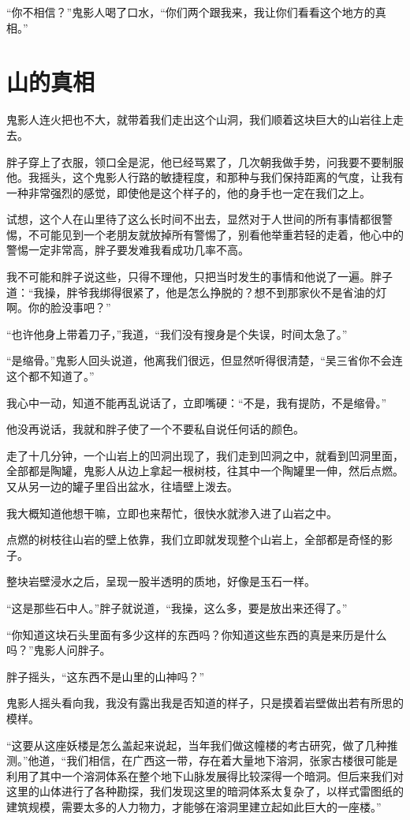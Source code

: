 “你不相信？”鬼影人喝了口水，“你们两个跟我来，我让你们看看这个地方的真相。”

\chapter{山的真相}

鬼影人连火把也不大，就带着我们走出这个山洞，我们顺着这块巨大的山岩往上走去。

胖子穿上了衣服，领口全是泥，他已经骂累了，几次朝我做手势，问我要不要制服他。我摇头，这个鬼影人行路的敏捷程度，和那种与我们保持距离的气度，让我有一种非常强烈的感觉，即使他是这个样子的，他的身手也一定在我们之上。

试想，这个人在山里待了这么长时间不出去，显然对于人世间的所有事情都很警惕，不可能见到一个老朋友就放掉所有警惕了，别看他举重若轻的走着，他心中的警惕一定非常高，胖子要发难我看成功几率不高。

我不可能和胖子说这些，只得不理他，只把当时发生的事情和他说了一遍。胖子道：“我操，胖爷我绑得很紧了，他是怎么挣脱的？想不到那家伙不是省油的灯啊。你的脸没事吧？”

“也许他身上带着刀子，”我道，“我们没有搜身是个失误，时间太急了。”

“是缩骨。”鬼影人回头说道，他离我们很远，但显然听得很清楚，“吴三省你不会连这个都不知道了。”

我心中一动，知道不能再乱说话了，立即嘴硬：“不是，我有提防，不是缩骨。”

他没再说话，我就和胖子使了一个不要私自说任何话的颜色。

走了十几分钟，一个山岩上的凹洞出现了，我们走到凹洞之中，就看到凹洞里面，全部都是陶罐，鬼影人从边上拿起一根树枝，往其中一个陶罐里一伸，然后点燃。又从另一边的罐子里舀出盆水，往墙壁上泼去。

我大概知道他想干嘛，立即也来帮忙，很快水就渗入进了山岩之中。

点燃的树枝往山岩的壁上依靠，我们立即就发现整个山岩上，全部都是奇怪的影子。

整块岩壁浸水之后，呈现一股半透明的质地，好像是玉石一样。

“这是那些石中人。”胖子就说道，“我操，这么多，要是放出来还得了。”

“你知道这块石头里面有多少这样的东西吗？你知道这些东西的真是来历是什么吗？”鬼影人问胖子。

胖子摇头，“这东西不是山里的山神吗？”

鬼影人摇头看向我，我没有露出我是否知道的样子，只是摸着岩壁做出若有所思的模样。

“这要从这座妖楼是怎么盖起来说起，当年我们做这幢楼的考古研究，做了几种推测。”他道，“我们相信，在广西这一带，存在着大量地下溶洞，张家古楼很可能是利用了其中一个溶洞体系在整个地下山脉发展得比较深得一个暗洞。但后来我们对这里的山体进行了各种勘探，我们发现这里的暗洞体系太复杂了，以样式雷图纸的建筑规模，需要太多的人力物力，才能够在溶洞里建立起如此巨大的一座楼。”

